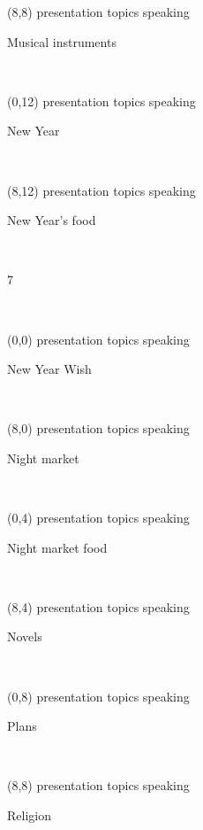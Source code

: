 \documentclass[a4paper]{article}
\newcommand{\mycard}[5]{%
	\small #1 #2
	\par
	\parbox[t][6.7cm][c]{9.5cm}{%
	\hspace{0.1cm} \Large#3\\
	\normalsize#4 #5
	}
}
\begin{document}
\begin{textblock}{8}(8,8)
\mycard{presentation topics}{speaking}{\parbox{9.0cm}{
\centering Musical instruments 
}}{}{} 
\end{textblock}

\begin{textblock}{8}(0,12)
\mycard{presentation topics}{speaking}{\parbox{9.0cm}{
\centering New Year    
}}{}{} 
\end{textblock}

\begin{textblock}{8}(8,12)
\mycard{presentation topics}{speaking}{\parbox{9.0cm}{
\centering New Year's food  
}}{}{} 
\end{textblock}

\begin{tiny}7\end{tiny}\\
\newpage

\begin{textblock}{8}(0,0)
\mycard{presentation topics}{speaking}{\parbox{9.0cm}{
\centering New Year Wish 
}}{}{} 
\end{textblock}

\begin{textblock}{8}(8,0)
\mycard{presentation topics}{speaking}{\parbox{9.0cm}{
\centering Night market  
}}{}{} 
\end{textblock}

\begin{textblock}{8}(0,4)
\mycard{presentation topics}{speaking}{\parbox{9.0cm}{
\centering Night market food   
}}{}{} 
\end{textblock}

\begin{textblock}{8}(8,4)
\mycard{presentation topics}{speaking}{\parbox{9.0cm}{
\centering Novels     
}}{}{} 
\end{textblock}

\begin{textblock}{8}(0,8)
\mycard{presentation topics}{speaking}{\parbox{9.0cm}{
\centering Plans         
}}{}{} 
\end{textblock}

\begin{textblock}{8}(8,8)
\mycard{presentation topics}{speaking}{\parbox{9.0cm}{
\centering Religion   
}}{}{} 
\end{textblock}
\end{document}
